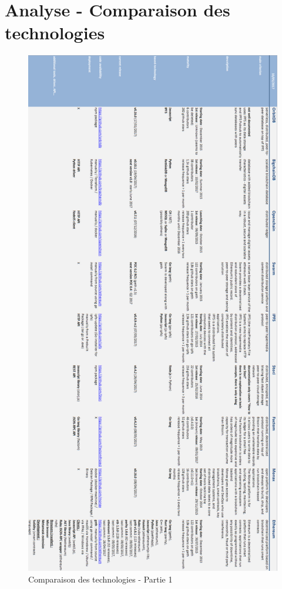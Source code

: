 \documentclass{tnreport}
\begin{document}
\chapter{Analyse - Comparaison des technologies}
\label{anx:comparison}

\begin{figure}[h]
	\centering
	\includegraphics[scale=0.5]{figures/blockchain-technologies-comparison-part1}
	\caption{Comparaison des technologies - Partie 1}
	\label{fig:comparison-part1}
\end{figure}
\end{document}
